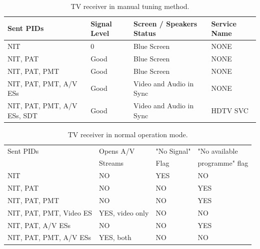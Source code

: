 \documentclass[
	12pt,				%
	openright,			%
	twoside,			%
	a4paper,			%
	brazil,
	french,				%
	english
	]{abntex2}
\begin{document}
\begin{table}
    \caption {TV receiver in manual tuning method.}
    \begin{center}
\begin{tabular}{|l|l|l|l|}
    \hline
    Sent PIDs                   & Signal Level & Screen / Speakers Status & Service Name \\ \hline
    NIT                         & 0            & Blue Screen              & NONE         \\ \hline
    NIT, PAT                    & Good         & Blue Screen              & NONE         \\ \hline
    NIT, PAT, PMT               & Good         & Blue Screen              & NONE         \\ \hline
    NIT, PAT, PMT, A/V ESs      & Good         & Video and Audio in Sync  & NONE         \\ \hline
    NIT, PAT, PMT, A/V ESs, SDT & Good         & Video and Audio in Sync  & HDTV SVC \\ \hline
    \end{tabular}
	\label{tab_manual_tuning}
\end{center}

\end{table}

\begin{table}
    \caption {TV receiver in normal operation mode.}
    \begin{center}
\begin{tabular}{|l|l|l|l|}
    \hline
    Sent PIDs               & Opens A/V & "No Signal" & "No available \\
                   & Streams & Flag & programme" flag \\ \hline
    NIT                     & NO                & YES              & NO                            \\ \hline
    NIT, PAT                & NO                & NO               & YES                           \\ \hline
    NIT, PAT, PMT           & NO                & NO               & YES                           \\ \hline
    NIT, PAT, PMT, Video ES & YES, video only   & NO               & NO                            \\ \hline
    NIT, PAT, A/V ESs  & NO         & NO               & YES                            \\ \hline
	NIT, PAT, PMT, A/V ESs  & YES, both         & NO               & NO                            \\ \hline
    \end{tabular}
	\label{tab_normal_operation}
\end{center}
\end{table}
\end{document}
